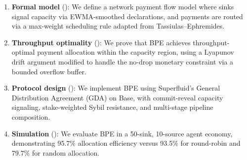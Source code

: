 \begin{enumerate}
    \item \textbf{Formal model} (): We define a network payment flow model
    where sinks signal capacity via EWMA-smoothed declarations, and payments are routed via
    a max-weight scheduling rule adapted from Tassiulas--Ephremides.

    \item \textbf{Throughput optimality} (): We prove that BPE achieves
    throughput-optimal payment allocation within the capacity region, using a Lyapunov drift
    argument modified to handle the no-drop monetary constraint via a bounded overflow buffer.

    \item \textbf{Protocol design} (): We implement BPE using Superfluid's
    General Distribution Agreement (GDA) on Base, with commit-reveal capacity signaling,
    stake-weighted Sybil resistance, and multi-stage pipeline composition.

    \item \textbf{Simulation} (): We evaluate BPE in a 50-sink,
    10-source agent economy, demonstrating 95.7\% allocation efficiency versus 93.5\% for
    round-robin and 79.7\% for random allocation.
\end{enumerate}
